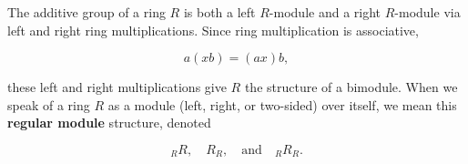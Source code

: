 The additive group of a ring $R$ is both a left $R$-module and a right $R$-module via left and right ring multiplications. Since ring multiplication is associative,

$$a(xb) = (ax)b,$$

these left and right multiplications give $R$ the structure of a bimodule. When we speak of a ring $R$ as a module (left, right, or two-sided) over itself, we mean this \textbf{regular module} structure, denoted

$$_R R, \quad R_R, \quad \text{and} \quad {}_R R_R.$$
